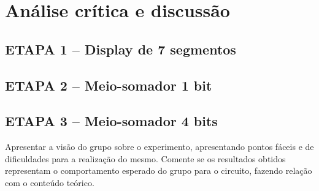 \chapter{Análise crítica e discussão}
\section{ETAPA 1 – Display de 7 segmentos}
\section{ETAPA 2 – Meio-somador 1 bit}
\section{ETAPA 3 – Meio-somador 4 bits}


Apresentar  a  visão do  grupo  sobre  o  experimento,  apresentando  pontos  fáceis  e
de  dificuldades  para  a  realização  do  mesmo.  Comente  se  os  resultados  obtidos
representam  o  comportamento  esperado   do   grupo   para  o   circuito,   fazendo
relação com o conteúdo teórico.
